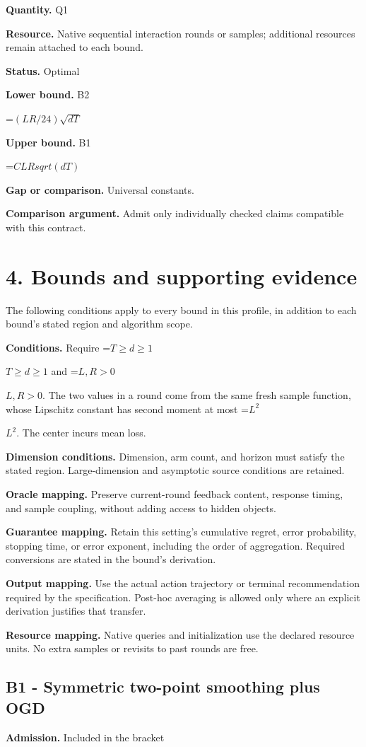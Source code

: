 \documentclass[10pt,a4paper]{article}
\newcommand{\AtlasMath}[1]{\par\begingroup\centering\setbox0=\hbox{$\displaystyle #1$}\ifdim\wd0>1.4\linewidth\typeout{ATLAS WIDE FORMULA: \the\wd0}\fi\ifdim\wd0>\linewidth\resizebox{\linewidth}{!}{\box0}\else\box0\fi\par\endgroup}
\newcommand{\AtlasInlineMath}[1]{\begingroup\setbox0=\hbox{$#1$}\ifdim\wd0>.4\linewidth\endgroup\AtlasMath{#1}\else\endgroup$#1$\fi}
\begin{document}
\textbf{Quantity.} Q1

\textbf{Resource.} Native sequential interaction rounds or samples; additional resources remain attached to each bound.

\textbf{Status.} Optimal

\textbf{Lower bound.} B2

\AtlasMath{(LR/24)\sqrt{dT}}
\textbf{Upper bound.} B1

\AtlasMath{C LRsqrt(dT)}
\textbf{Gap or comparison.} Universal constants.

\textbf{Comparison argument.} Admit only individually checked claims compatible with this contract.

\section{4. Bounds and supporting evidence}
The following conditions apply to every bound in this profile, in addition to each bound's stated region and algorithm scope.

\textbf{Conditions.} Require \AtlasInlineMath{T\ge d\ge1} and \AtlasInlineMath{L,R>0}. The two values in a round come from the same fresh sample function, whose Lipschitz constant has second moment at most \AtlasInlineMath{L^2}. The center incurs mean loss.

\textbf{Dimension conditions.} Dimension, arm count, and horizon must satisfy the stated region. Large-dimension and asymptotic source conditions are retained.

\textbf{Oracle mapping.} Preserve current-round feedback content, response timing, and sample coupling, without adding access to hidden objects.

\textbf{Guarantee mapping.} Retain this setting's cumulative regret, error probability, stopping time, or error exponent, including the order of aggregation. Required conversions are stated in the bound's derivation.

\textbf{Output mapping.} Use the actual action trajectory or terminal recommendation required by the specification. Post-hoc averaging is allowed only where an explicit derivation justifies that transfer.

\textbf{Resource mapping.} Native queries and initialization use the declared resource units. No extra samples or revisits to past rounds are free.

\subsection{B1 - Symmetric two-point smoothing plus OGD}
\textbf{Admission.} Included in the bracket
\end{document}
